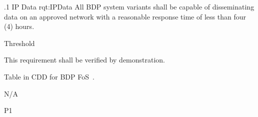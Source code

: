 
\ONERQMTVKPP
{\RqtNumberBase.1}
{IP Data}
{rqt:IPData}
{All BDP system variants shall be capable of disseminating data on an approved network with a reasonable response time of less than four (4) hours.}
{
	\item [Phase 1] Threshold
}
{This requirement shall be verified by demonstration.}
{
\item [5.4] Table in CDD for BDP FoS~\cite{ref__BDP_FOS_CDD}.
}
{
	\item N/A
}
{P1}


